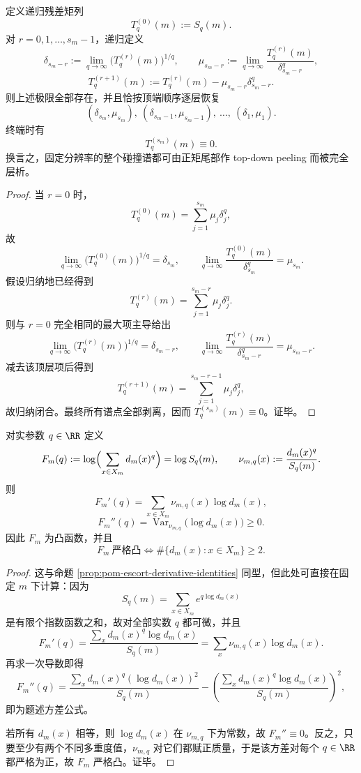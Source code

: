 \begin{theorem}[有限分辨率碰撞谱的逐层顶端剥离]\label{thm:conclusion-fixedresolution-topdown-peeling}
定义递归残差矩列
\[
T_q^{(0)}(m):=S_q(m).
\]
对 \(r=0,1,\dots,s_m-1\)，递归定义
\[
\delta_{s_m-r}
:=
\lim_{q\to\infty}\bigl(T_q^{(r)}(m)\bigr)^{1/q},
\qquad
\mu_{s_m-r}
:=
\lim_{q\to\infty}\frac{T_q^{(r)}(m)}{\delta_{s_m-r}^q},
\]
\[
T_q^{(r+1)}(m):=
T_q^{(r)}(m)-\mu_{s_m-r}\delta_{s_m-r}^q.
\]
则上述极限全部存在，并且恰按顶端顺序逐层恢复
\[
(\delta_{s_m},\mu_{s_m}),\ (\delta_{s_m-1},\mu_{s_m-1}),\ \dots,\ (\delta_1,\mu_1).
\]
终端时有
\[
T_q^{(s_m)}(m)\equiv 0.
\]
换言之，固定分辨率的整个碰撞谱都可由正矩尾部作 top-down peeling 而被完全层析。
\end{theorem}
\begin{proof}
当 \(r=0\) 时，
\[
T_q^{(0)}(m)=\sum_{j=1}^{s_m}\mu_j\delta_j^q,
\]
故
\[
\lim_{q\to\infty}\bigl(T_q^{(0)}(m)\bigr)^{1/q}=\delta_{s_m},
\qquad
\lim_{q\to\infty}\frac{T_q^{(0)}(m)}{\delta_{s_m}^q}=\mu_{s_m}.
\]
假设归纳地已经得到
\[
T_q^{(r)}(m)=\sum_{j=1}^{s_m-r}\mu_j\delta_j^q.
\]
则与 \(r=0\) 完全相同的最大项主导给出
\[
\lim_{q\to\infty}\bigl(T_q^{(r)}(m)\bigr)^{1/q}=\delta_{s_m-r},
\qquad
\lim_{q\to\infty}\frac{T_q^{(r)}(m)}{\delta_{s_m-r}^q}=\mu_{s_m-r}.
\]
减去该顶层项后得到
\[
T_q^{(r+1)}(m)=\sum_{j=1}^{s_m-r-1}\mu_j\delta_j^q,
\]
故归纳闭合。最终所有谱点全部剥离，因而 \(T_q^{(s_m)}(m)\equiv 0\)。证毕。
\end{proof}

\begin{proposition}[碰撞矩轴是一条有限指数族的对数配分函数]\label{prop:conclusion-fixedresolution-logpartition-escort-convexity}
对实参数 \(q\in\RR\) 定义
\[
F_m(q):=\log\Bigl(\sum_{x\in X_m}d_m(x)^q\Bigr)=\log S_q(m),
\qquad
\nu_{m,q}(x):=\frac{d_m(x)^q}{S_q(m)}.
\]
则
\[
F_m'(q)=\sum_{x\in X_m}\nu_{m,q}(x)\log d_m(x),
\]
\[
F_m''(q)=\operatorname{Var}_{\nu_{m,q}}\!\bigl(\log d_m(x)\bigr)\ge 0.
\]
因此 \(F_m\) 为凸函数，并且
\[
F_m\ \text{严格凸}
\iff
\#\{d_m(x):x\in X_m\}\ge 2.
\]
\end{proposition}
\begin{proof}
这与命题 \ref{prop:pom-escort-derivative-identities} 同型，但此处可直接在固定 \(m\) 下计算：因为
\[
S_q(m)=\sum_{x\in X_m}e^{q\log d_m(x)}
\]
是有限个指数函数之和，故对全部实数 \(q\) 都可微，并且
\[
F_m'(q)
=
\frac{\sum_x d_m(x)^q\log d_m(x)}{S_q(m)}
=
\sum_x \nu_{m,q}(x)\log d_m(x).
\]
再求一次导数即得
\[
F_m''(q)
=
\frac{\sum_x d_m(x)^q(\log d_m(x))^2}{S_q(m)}
-
\left(
\frac{\sum_x d_m(x)^q\log d_m(x)}{S_q(m)}
\right)^2,
\]
即为题述方差公式。

若所有 \(d_m(x)\) 相等，则 \(\log d_m(x)\) 在 \(\nu_{m,q}\) 下为常数，故 \(F_m''\equiv 0\)。反之，只要至少有两个不同多重度值，\(\nu_{m,q}\) 对它们都赋正质量，于是该方差对每个 \(q\in\RR\) 都严格为正，故 \(F_m\) 严格凸。证毕。
\end{proof}

